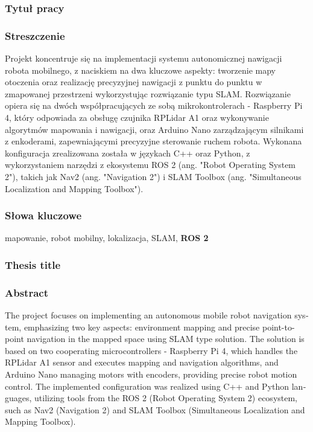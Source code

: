 \documentclass[a4paper,twoside,12pt]{book}
\begin{document}


\cleardoublepage

\rmfamily\normalfont
\pagestyle{empty}


\subsubsection*{Tytuł pracy} 
\Title
\subsubsection*{Streszczenie}  
Projekt koncentruje się na implementacji systemu autonomicznej nawigacji robota mobilnego, z naciskiem na dwa kluczowe aspekty: tworzenie mapy otoczenia oraz realizację precyzyjnej nawigacji z punktu do punktu w zmapowanej przestrzeni wykorzystując rozwiązanie typu SLAM. Rozwiązanie opiera się na dwóch współpracujących ze sobą mikrokontrolerach - Raspberry Pi 4, który odpowiada za obsługę czujnika RPLidar A1 oraz wykonywanie algorytmów mapowania i nawigacji, oraz Arduino Nano zarządzającym silnikami z enkoderami, zapewniającymi precyzyjne sterowanie ruchem robota. Wykonana konfiguracja zrealizowana została w językach C++ oraz Python, z wykorzystaniem narzędzi z ekosystemu ROS 2 (ang. "Robot Operating System 2"), takich jak Nav2 (ang. "Navigation 2") i SLAM Toolbox (ang. "Simultaneous Localization and Mapping Toolbox").


\subsubsection*{Słowa kluczowe} 
mapowanie, robot mobilny, lokalizacja, SLAM, \textbf{ROS 2}
\subsubsection*{Thesis title} 
\begin{otherlanguage}{british}
\TitleAlt
\end{otherlanguage}

\subsubsection*{Abstract} 
\begin{otherlanguage}{british}
The project focuses on implementing an autonomous mobile robot navigation system, emphasizing two key aspects: environment mapping and precise point-to-point navigation in the mapped space using SLAM type solution. The solution is based on two cooperating microcontrollers - Raspberry Pi 4, which handles the RPLidar A1 sensor and executes mapping and navigation algorithms, and Arduino Nano managing motors with encoders, providing precise robot motion control. The implemented configuration was realized using C++ and Python languages, utilizing tools from the ROS 2 (Robot Operating System 2) ecosystem, such as Nav2 (Navigation 2) and SLAM Toolbox (Simultaneous Localization and Mapping Toolbox).

\end{otherlanguage}
\end{document}
